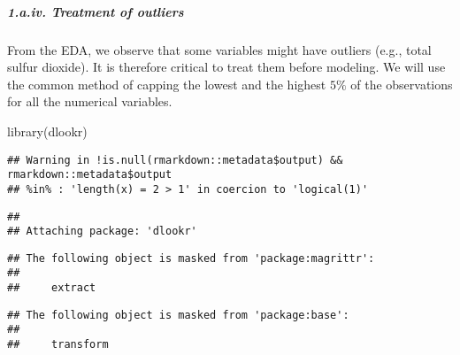 \documentclass[
]{article}
\newenvironment{Shaded}{\begin{snugshade}}{\end{snugshade}}
\newcommand{\FunctionTok}[1]{\textcolor[rgb]{0.00,0.00,0.00}{#1}}
\newcommand{\NormalTok}[1]{#1}
\begin{document}
\hypertarget{a.iv.-treatment-of-outliers}{%
\subparagraph{1.a.iv. Treatment of
outliers}\label{a.iv.-treatment-of-outliers}}

From the EDA, we observe that some variables might have outliers (e.g.,
total sulfur dioxide). It is therefore critical to treat them before
modeling. We will use the common method of capping the lowest and the
highest \(5\%\) of the observations for all the numerical variables.

\begin{Shaded}
\begin{Highlighting}[]
\FunctionTok{library}\NormalTok{(dlookr)}
\end{Highlighting}
\end{Shaded}

\begin{verbatim}
## Warning in !is.null(rmarkdown::metadata$output) && rmarkdown::metadata$output
## %in% : 'length(x) = 2 > 1' in coercion to 'logical(1)'
\end{verbatim}

\begin{verbatim}
## 
## Attaching package: 'dlookr'
\end{verbatim}

\begin{verbatim}
## The following object is masked from 'package:magrittr':
## 
##     extract
\end{verbatim}

\begin{verbatim}
## The following object is masked from 'package:base':
## 
##     transform
\end{verbatim}
\end{document}
